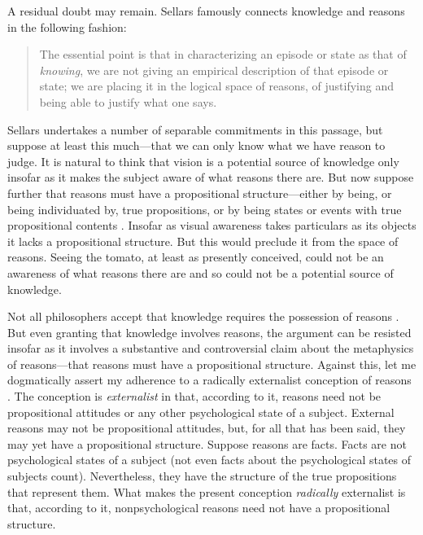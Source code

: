 \documentclass[12pt]{article}
\begin{document}
A residual doubt may remain. Sellars famously connects knowledge and reasons in the following fashion:
\begin{quote}
	The essential point is that in characterizing an episode or state as that of \emph{knowing}, we are not giving an empirical description of that episode or state; we are placing it in the logical space of reasons, of justifying and being able to justify what one says. \citep[§36]{Sellars:1956xp}
\end{quote}
Sellars undertakes a number of separable commitments in this passage, but suppose at least this much---that we can only know what we have reason to judge. It is natural to think that vision is a potential source of knowledge only insofar as it makes the subject aware of what reasons there are. But now suppose further that reasons must have a propositional structure---either by being, or being individuated by, true propositions, or by being states or events with true propositional contents \citep[see][141, 143--4]{McDowell:1996uq}. Insofar as visual awareness takes particulars as its objects it lacks a propositional structure. But this would preclude it from the space of reasons. Seeing the tomato, at least as presently conceived, could not be an awareness of what reasons there are and so could not be a potential source of knowledge.

Not all philosophers accept that knowledge requires the possession of reasons \citep[see][]{Pryor:2007fk}. But even granting that knowledge involves reasons, the argument can be resisted insofar as it involves a substantive and controversial claim about the metaphysics of reasons---that reasons must have a propositional structure. Against this, let me dogmatically assert my adherence to a radically externalist conception of reasons \citep[see][]{Scanlon:1998hb,Raz:2000tm}. The conception is \emph{externalist} in that, according to it, reasons need not be propositional attitudes or any other psychological state of a subject. External reasons may not be propositional attitudes, but, for all that has been said, they may yet have a propositional structure. Suppose reasons are facts. Facts are not psychological states of a subject (not even facts about the psychological states of subjects count). Nevertheless, they have the structure of the true propositions that represent them. What makes the present conception \emph{radically} externalist is that, according to it, nonpsychological reasons need not have a propositional structure.
\end{document}
